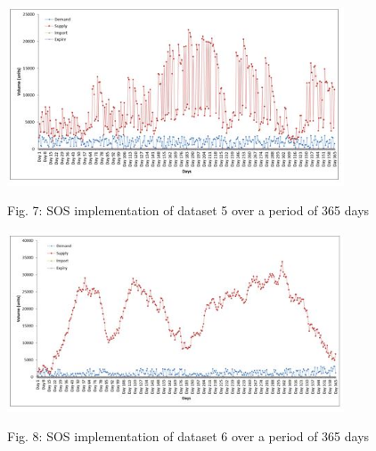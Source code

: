 \documentclass{article}
\begin{document}
\includegraphics[width=0.75\textwidth, center]{Images/Fig7.JPG}
\begin {center}
Fig. 7: { SOS implementation of dataset 5 over a period of 365 days}

\end {center}


\includegraphics[width=0.75\textwidth, center]{Images/Fig8.JPG}
\begin {center}
Fig. 8: { SOS implementation of dataset 6 over a period of 365 days}

\end {center}
\\
\\
\end{document}
